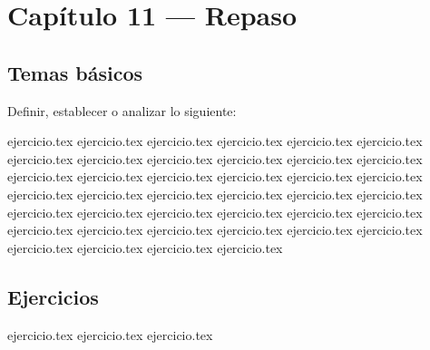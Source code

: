 
\section*{Capítulo 11 --- Repaso}

\subsection*{Temas básicos}

Definir, establecer o analizar lo siguiente:

\begin{enumerate}
    {ejercicio.tex}
{ejercicio.tex}
{ejercicio.tex}
{ejercicio.tex}
{ejercicio.tex}
{ejercicio.tex}
{ejercicio.tex}
{ejercicio.tex}
{ejercicio.tex}
{ejercicio.tex}
{ejercicio.tex}
{ejercicio.tex}
{ejercicio.tex}
{ejercicio.tex}
{ejercicio.tex}
{ejercicio.tex}
{ejercicio.tex}
{ejercicio.tex}
{ejercicio.tex}
{ejercicio.tex}
{ejercicio.tex}
{ejercicio.tex}
{ejercicio.tex}
{ejercicio.tex}
{ejercicio.tex}
{ejercicio.tex}
{ejercicio.tex}
{ejercicio.tex}
{ejercicio.tex}
{ejercicio.tex}
{ejercicio.tex}
{ejercicio.tex}
{ejercicio.tex}
{ejercicio.tex}
{ejercicio.tex}
{ejercicio.tex}
{ejercicio.tex}
{ejercicio.tex}
{ejercicio.tex}
{ejercicio.tex}
\end{enumerate}

\vspace{0.5cm}
\subsection*{Ejercicios}

\begin{enumerate}
    \setcounter{enumi}{74}
    {ejercicio.tex}
{ejercicio.tex}
{ejercicio.tex}
\end{enumerate}


